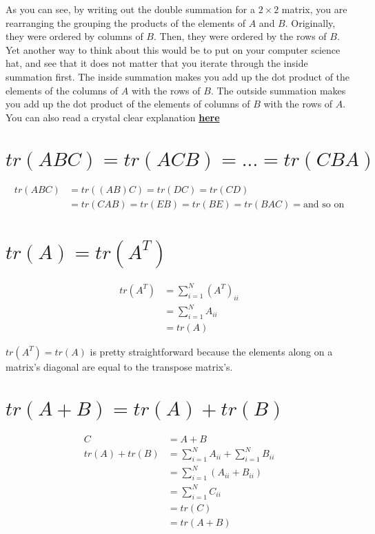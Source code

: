 \documentclass[a4paper, 12pt]{article}
\begin{document}
As you can see, by writing out the double summation for a $2\times2$ matrix, you are rearranging the grouping the products of the elements of $A$ and $B$. Originally, they were ordered by columns of $B$. Then, they were ordered by the rows of $B$. Yet another way to think about this would be to put on your computer science hat, and see that it does not matter that you iterate through the inside summation first. The inside summation makes you add up the dot product of the elements of the columns of $A$ with the rows of $B$. The outside summation makes you add up the dot product of the elements of columns of $B$ with the rows of $A$. You can also read a crystal clear explanation \href{http://math.stackexchange.com/questions/1314142/trace-of-ab-trace-of-ba/1314147}{\textbf{here}} 

\section{\(tr(ABC) = tr(ACB) = ... = tr(CBA)\)}
\begin{align*}
tr(ABC) & = tr((AB)C) = tr(DC) = tr(CD)\\
& = tr(CAB) = tr(EB) = tr(BE) = tr(BAC) = \text{and so on}
\end{align*}

\section{\(tr(A) = tr(A^{T}) \)}
\begin{align*}
tr(A^T) &= \sum_{i=1}^N(A^T)_{ii}\\
&= \sum_{i=1}^NA_{ii}\\
&= tr(A)
\end{align*}

$tr(A^T) = tr(A)$ is pretty straightforward because the elements along on a matrix's diagonal are equal to the transpose matrix's.

\section{\(tr(A + B) = tr(A) + tr(B) \)}
\begin{align*}
C &= A + B\\
tr(A) + tr(B) &= \sum_{i=1}^NA_{ii} + \sum_{i=1}^NB_{ii}\\
&=  \sum_{i=1}^N(A_{ii} + B_{ii})\\
&= \sum_{i=1}^NC_{ii}\\
&= tr(C)\\
&= tr(A + B)
\end{align*}
\end{document}
